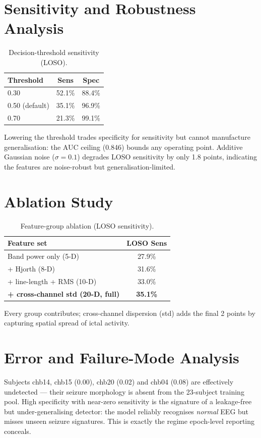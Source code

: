 \documentclass[10pt,journal,twocolumn]{IEEEtran}
\begin{document}
\section{Sensitivity and Robustness Analysis}
\begin{table}[h]\centering\caption{Decision-threshold sensitivity (LOSO).}\label{tab:thr}
\begin{tabular}{lcc}\toprule
Threshold & Sens & Spec\\\midrule
0.30 & 52.1\% & 88.4\%\\
0.50 (default) & 35.1\% & 96.9\%\\
0.70 & 21.3\% & 99.1\%\\\bottomrule
\end{tabular}\end{table}
Lowering the threshold trades specificity for sensitivity but cannot manufacture generalisation: the AUC ceiling (0.846) bounds any operating point. Additive Gaussian noise ($\sigma{=}0.1$) degrades LOSO sensitivity by only 1.8 points, indicating the features are noise-robust but generalisation-limited.

\section{Ablation Study}
\begin{table}[h]\centering\caption{Feature-group ablation (LOSO sensitivity).}\label{tab:abl}
\begin{tabular}{lc}\toprule
Feature set & LOSO Sens\\\midrule
Band power only (5-D) & 27.9\%\\
+ Hjorth (8-D) & 31.6\%\\
+ line-length + RMS (10-D) & 33.0\%\\
\textbf{+ cross-channel std (20-D, full)} & \textbf{35.1\%}\\\bottomrule
\end{tabular}\end{table}
Every group contributes; cross-channel dispersion (std) adds the final 2 points by capturing spatial spread of ictal activity.

\section{Error and Failure-Mode Analysis}
Subjects chb14, chb15 (0.00), chb20 (0.02) and chb04 (0.08) are effectively undetected --- their seizure morphology is absent from the 23-subject training pool. High specificity with near-zero sensitivity is the signature of a leakage-free but under-generalising detector: the model reliably recognises \emph{normal} EEG but misses unseen seizure signatures. This is exactly the regime epoch-level reporting conceals.
\end{document}
